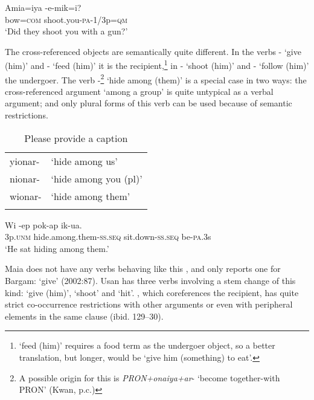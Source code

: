 \ea%
\label{ex:3:x336}
\gll Amia=iya -e-mik=i? \\
bow=\textsc{com} shoot.you-\textsc{pa}-1/3p=\textsc{qm}\\
\glt`Did they shoot you with a gun?'
\z

The cross-referenced objects are semantically quite different. In the verbs - `give (him)' and - `feed (him)' it is the recipient,\footnote{ `feed (him)' requires a food term as the undergoer object, so a better translation, but longer, would be `give him (something) to eat'.} in - `shoot (him)' and - `follow (him)' the undergoer. The verb -\footnote{A possible origin for this is \textit{PRON+onaiya+ar}- `become together-with PRON' (Kwan, p.c.)} `hide among (them)' is a special case in two ways: the cross-referenced argument `among a group' is quite untypical as a verbal argument; and only plural forms of this verb can be used because of semantic restrictions. 

\begin{table}
\caption{Please provide a caption}
\label{} 
\begin{tabular}{ll}
\mytoprule
yionar- &`hide among us'\\
nionar- &`hide among you (pl)'\\
wionar- &`hide among them'\\
\mybottomrule
\end{tabular}

\end{table}

\ea%
\label{ex:3:x337}
\gll Wi -ep pok-ap ik-ua. \\
3p.\textsc{unm} hide.among.them-\textsc{ss}.\textsc{seq} sit.down-\textsc{ss}.\textsc{seq} be-\textsc{pa}.3s \\
\glt`He sat hiding among them.'
\z

Maia does not have any verbs behaving like this \citep{Hardin2002}, and \citeauthor{Hepner2002} only reports one for Bargam:  `give' (2002:87). Usan has three verbs involving a stem change of this kind:  `give (him)',  `shoot' and  `hit'\citep[44]{Reesink1987}. , which coreferences the recipient, has quite strict co-occurrence restrictions with other arguments or even with peripheral elements in the same clause (ibid. 129--30). 

